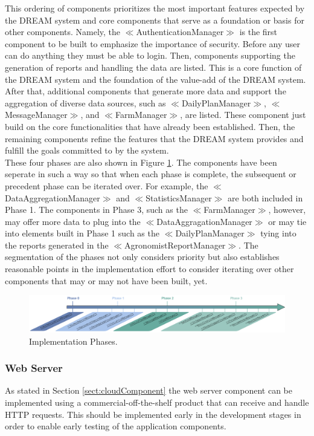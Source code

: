 \noindent
This ordering of components prioritizes the most important features expected by the DREAM system and core components that serve as a foundation or basis for other components. Namely, the \(\ll\)AuthenticationManager\(\gg\) is the first component to be built to emphasize the importance of security. Before any user can do anything they must be able to login. Then, components supporting the generation of reports and handling the data are listed. This is a core function of the DREAM system and the foundation of the value-add of the DREAM system. After that, additional components that generate more data and support the aggregation of diverse data sources, such as \(\ll\)DailyPlanManager\(\gg\), \(\ll\)MessageManager\(\gg\), and \(\ll\)FarmManager\(\gg\), are listed. These component just build on the core functionalities that have already been established. Then, the remaining components refine the features that the DREAM system provides and fulfill the goals committed to by the system. \\
\smallskip
These four phases are also shown in Figure \ref{fig:implementationPhases}. The components have been seperate in such a way so that when each phase is complete, the subsequent or precedent phase can be iterated over. For example, the \(\ll\)DataAggregationManager\(\gg\) and \(\ll\)StatisticsManager\(\gg\) are both included in Phase 1. The components in Phase 3, such as the \(\ll\)FarmManager\(\gg\), however, may offer more data to plug into the \(\ll\)DataAggragationManager\(\gg\) or may tie into elements built in Phase 1 such as the \(\ll\)DailyPlanManager\(\gg\) tying into the reports generated in the \(\ll\)AgronomistReportManager\(\gg\). The segmentation of the phases not only considers priority but also establishes reasonable points in the implementation effort to consider iterating over other components that may or may not have been built, yet. 

\begin{figure}[hbt!]
\centering
\includegraphics[width=\textwidth]{../images_diagrams/dd/implementation_phases.png}
\caption{Implementation Phases.}
\label{fig:implementationPhases}
\end{figure}

\subsubsection{Web Server}
\noindent
As stated in Section \ref{sect:cloudComponent} the web server component can be implemented using a commercial-off-the-shelf product that can receive and handle HTTP requests. This should be implemented early in the development stages in order to enable early testing of the application components. 

